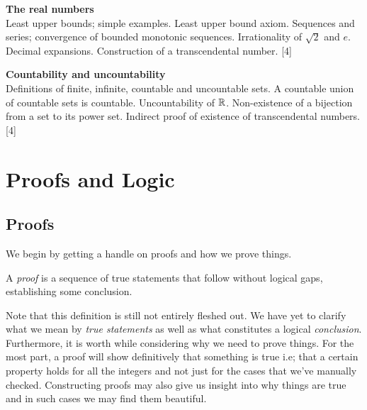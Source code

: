 \documentclass{article}
\begin{document}
{    \vspace{10pt}
    \noindent\textbf{The real numbers}\\
    Least upper bounds; simple examples. Least upper bound axiom. Sequences and series; convergence of bounded monotonic sequences. Irrationality of $\sqrt{2}$ and $e$. Decimal expansions. Construction of a transcendental number.\hspace*{\fill} [4]
  
    \vspace{10pt}
    \noindent\textbf{Countability and uncountability}\\
    Definitions of finite, infinite, countable and uncountable sets. A countable union of countable sets is countable. Uncountability of $\mathbb{R}$. Non-existence of a bijection from a set to its power set. Indirect proof of existence of transcendental numbers.\hspace*{\fill}[4]}

\tableofcontents


\section{Proofs and Logic}
\subsection{Proofs}

We begin by getting a handle on proofs and how we prove things.

\begin{defi}[Proof]
    A \emph{proof} is a sequence of true statements that follow without logical gaps, establishing some conclusion.
\end{defi}

Note that this definition is still not entirely fleshed out. We have yet to clarify what we mean by \emph{true statements} as well as what constitutes a logical \emph{conclusion}. Furthermore, it is worth while considering why we need to prove things. For the most part, a proof will show definitively that something is true i.e; that a certain property holds for all the integers and not just for the cases that we've manually checked. Constructing proofs may also give us insight into why things are true and in such cases we may find them beautiful.
\end{document}
